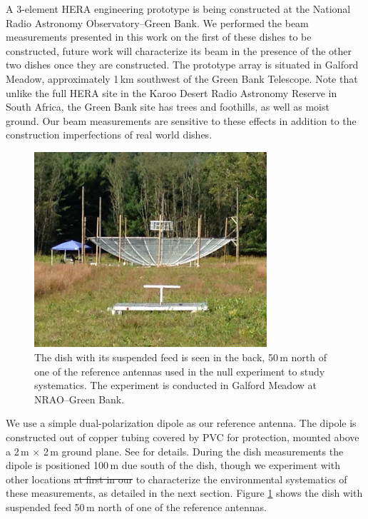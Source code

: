 \documentclass{emulateapj}
\providecommand{\DIFadd}[1]{{\protect\color{blue}\uwave{#1}}} %
\providecommand{\DIFdel}[1]{{\protect\color{red}\sout{#1}}}                      %
\providecommand{\DIFaddbegin}{} %
\providecommand{\DIFaddend}{} %
\providecommand{\DIFdelbegin}{} %
\providecommand{\DIFdelend}{} %
\begin{document}
A 3-element HERA engineering prototype is being constructed at the National Radio 
Astronomy Observatory--Green Bank. We performed the beam measurements presented in 
this work on the first of these dishes to be constructed, future work will characterize its beam in the presence of the other two dishes once they are constructed. The prototype array is situated in Galford Meadow, approximately 1\,km southwest of the Green Bank Telescope. Note that unlike the full HERA site in the Karoo Desert Radio Astronomy Reserve in 
South Africa, the Green Bank site has trees and foothills, as well as moist ground. Our beam measurements
are sensitive to these effects in addition to the construction imperfections of real world dishes.

\begin{figure}[h]
\includegraphics[width=3.4in]{ref_dipole_and_hera_dish.jpg}
\caption{The dish with its suspended feed is seen in the back, 50\,m north of one of the reference antennas used in the null experiment to study systematics. The experiment is conducted in Galford Meadow at NRAO--Green Bank.}
\label{fig:greenbankdishphoto}
\end{figure}

We use a simple dual-polarization dipole as our reference antenna. The dipole is constructed out of copper tubing covered by PVC for protection, mounted above a 2\,m $\times$ 2\,m ground plane. See \citet{neben15} for details. During the dish measurements the dipole is positioned 100\,m due south of the dish, though we experiment with other locations \DIFdelbegin \DIFdel{at first in our }\DIFdelend \DIFaddbegin \DIFadd{in order }\DIFaddend to characterize the environmental systematics of these measurements, as detailed in the next section. Figure \ref{fig:greenbankdishphoto} shows the dish with suspended feed 50\,m north of one of the reference antennas.
\end{document}
